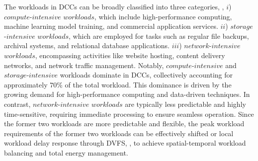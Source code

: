 \documentclass[lettersize,journal]{IEEEtran}
\begin{document}
The workloads in DCCs can be broadly classified into three categories, \cite{6041050}, $i$) $compute$-$intensive$ $workloads$, which include high-performance computing, machine learning model training, and commercial application services. $ii$) $storage$-$intensive$ $workloads$, which are employed for tasks such as regular file backups, archival systems, and relational database applications. $iii$) $network$-$intensive$ $workloads$, encompassing activities like website hosting, content delivery networks, and network traffic management. Notably, $compute$-$intensive$ and $storage$-$intensive$ workloads dominate in DCCs, collectively accounting for approximately $70$\% of the total workload. This dominance is driven by the growing demand for high-performance computing and data-driven techniques. In contrast, $network$-$intensive$ $workloads$ are typically less predictable and highly time-sensitive, requiring immediate processing to ensure seamless operation. Since the former two workloads are more predictable and flexible, the peak workload requirements of the former two workloads can be effectively shifted or local workload delay response through DVFS, \cite{lin2023workload,7039172,6041050}, to achieve spatial-temporal workload balancing and total energy management.
\end{document}
